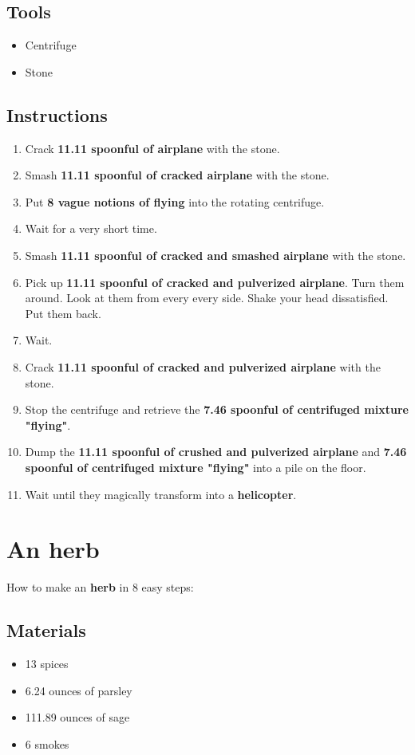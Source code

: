 \documentclass{article}
\begin{document}
\subsection{Tools}\begin{itemize}
\item 
Centrifuge
\item 
Stone
\end{itemize}
\subsection{Instructions}\begin{enumerate}
\item 
Crack \textbf{11.11 spoonful of airplane} with the stone.
\item 
Smash \textbf{11.11 spoonful of cracked airplane} with the stone.
\item 
Put \textbf{8 vague notions of flying} into the rotating centrifuge.
\item 
Wait for a very short time.
\item 
Smash \textbf{11.11 spoonful of cracked and smashed airplane} with the stone.
\item 
Pick up \textbf{11.11 spoonful of cracked and pulverized airplane}. Turn them around. Look at them from every every side. Shake your head dissatisfied. Put them back.
\item 
Wait.
\item 
Crack \textbf{11.11 spoonful of cracked and pulverized airplane} with the stone.
\item 
Stop the centrifuge and retrieve the \textbf{7.46 spoonful of centrifuged mixture "flying"}.
\item 
Dump the \textbf{11.11 spoonful of crushed and pulverized airplane} and \textbf{7.46 spoonful of centrifuged mixture "flying"} into a pile on the floor.
\item 
Wait until they magically transform into a \textbf{helicopter}.
\end{enumerate}
\newpage
\section{An herb}How to make an \textbf{herb} in 8 easy steps:

\subsection{Materials}\begin{itemize}
\item 
13 spices
\item 
6.24 ounces of parsley
\item 
111.89 ounces of sage
\item 
6 smokes
\end{itemize}
\end{document}

